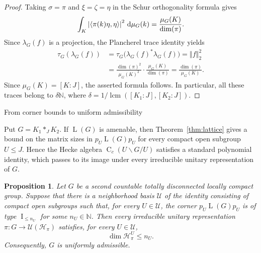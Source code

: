 \documentclass[11pt]{amsart}
\makeatletter
\numberwithin{equation}{section}
\def\subsection{\@startsection{subsection}{2}%
  \z@{.7\linespacing\@plus.7\linespacing}{.3\linespacing}%
  {\normalfont\bfseries}}
\newcommand{\nn}{\mathbb N}
\renewcommand{\H}{\mathcal H}
\newcommand{\U}{\mathcal U}
\DeclareMathOperator{\LL}{L}
\DeclareMathOperator{\I}{I}
\DeclareMathOperator{\lcm}{lcm}
\newcommand{\abs}[1]{\left\lvert #1\right\rvert}
\newcommand{\norm}[1]{\left\Vert #1\right\Vert}
\newcommand{\ps}[2]{\left\langle #1,#2\right\rangle}
\newcommand{\rC}{\operatorname{C}}
\newcommand{\Hk}[2]{\rC_c(#2\backslash #1/#2)}
\newtheorem{Prop}[The]{Proposition}
\theoremstyle{definition}
\makeatother
\begin{document}
\begin{proof}
    Taking $\sigma=\pi$ and $\xi=\zeta=\eta$ in the Schur orthogonality formula gives
    $$
        \int_K\abs{\ps{\pi(k)\eta}{\eta}}^2\,{\rm d}\mu_G(k)
        =\frac{\mu_G(K)}{\dim(\pi)}.
    $$
    Since $\lambda_G(f)$ is a projection, the Plancherel trace identity yields
    $$
        \begin{aligned}
            \tau_G(\lambda_G(f))
            &=\tau_G\bigl(\lambda_G(f)^*\lambda_G(f)\bigr)=\norm{f}_2^2\\
            &=\frac{\dim(\pi)^2}{\mu_G(K)^2}\cdot\frac{\mu_G(K)}{\dim(\pi)}
            =\frac{\dim(\pi)}{\mu_G(K)}.
        \end{aligned}
    $$
    Since $\mu_G(K)=[K:J]$, the asserted formula follows. In particular, all these traces belong to $\delta\nn$, where $\delta=1/\lcm([K_1:J],[K_2:J])$.
\end{proof}

\subsection{From corner bounds to uniform admissibility}
\label{subsec:compact-admissibility}

Put $G=K_1\ast_JK_2$. If $\LL(G)$ is amenable, then Theorem~\ref{thm:lattice} gives a bound on the matrix sizes in $p_U\LL(G)p_U$ for every compact open subgroup $U\leq J$. Hence the Hecke algebra $\Hk GU$ satisfies a standard polynomial identity, which passes to its image under every irreducible unitary representation of $G$.

\begin{Prop}
    \label{prop:full-pi-transfer}
    Let $G$ be a second countable totally disconnected locally compact group. Suppose that there is a neighborhood basis $\U$ of the identity consisting of compact open subgroups such that, for every $U\in\U$, the corner $p_U\LL(G)p_U$ is of type $\I_{\leq n_U}$ for some $n_U\in\nn$. Then every irreducible unitary representation $\pi:G\to\U(\H_\pi)$ satisfies, for every $U\in\U$,
    $$
        \dim\H_\pi^U\leq n_U.
    $$
    Consequently, $G$ is uniformly admissible.
\end{Prop}
\end{document}
